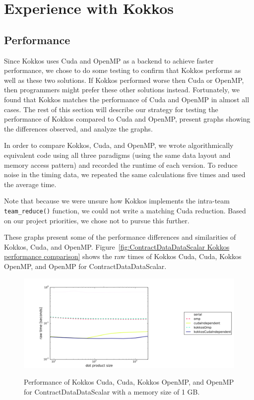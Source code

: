 \chapter{Experience with Kokkos}
\section{Performance}
Since Kokkos uses Cuda and OpenMP as a backend to achieve faster performance, we
chose to do some testing to confirm that Kokkos performs as well as these two
solutions. If Kokkos performed worse then Cuda or OpenMP, then programmers might
prefer these other solutions instead.  Fortunately, we found that Kokkos matches
the performance of Cuda and OpenMP in almost all cases.  The rest of this
section will describe our strategy for testing the performance of Kokkos
compared to Cuda and OpenMP, present graphs showing the differences observed,
and analyze the graphs.

In order to compare Kokkos, Cuda, and OpenMP, we wrote algorithmically
equivalent code using all three paradigms (using the same data layout and memory
access pattern) and recorded the runtime of each version.  To reduce noise in
the timing data, we repeated the same calculations five times and used the
average time.

Note that because we were unsure how Kokkos implements the intra-team \texttt{team\_reduce()}
function, we could not write a matching Cuda reduction.  Based on our project
priorities, we chose not to pursue this further.

These graphs present some of the performance differences and similarities of
Kokkos, Cuda, and OpenMP. Figure~\ref{fig:ContractDataDataScalar Kokkos
performance comparison} shows the raw times of Kokkos Cuda, Cuda, Kokkos OpenMP,
and OpenMP for ContractDataDataScalar.

\begin{figure}[!ht]
{\includegraphics[scale=.4]{CDDS_RawTimes_2d_largestSize_ComparisonFixed.pdf}}
\caption[ContractDataDataScalar Kokkos performance comparison]{
    Performance of Kokkos Cuda, Cuda, Kokkos OpenMP,
and OpenMP for ContractDataDataScalar with a memory size of 1 GB.}
\label{fig:ContractDataDataScalar Kokkos performance comparison}
\end{figure}

